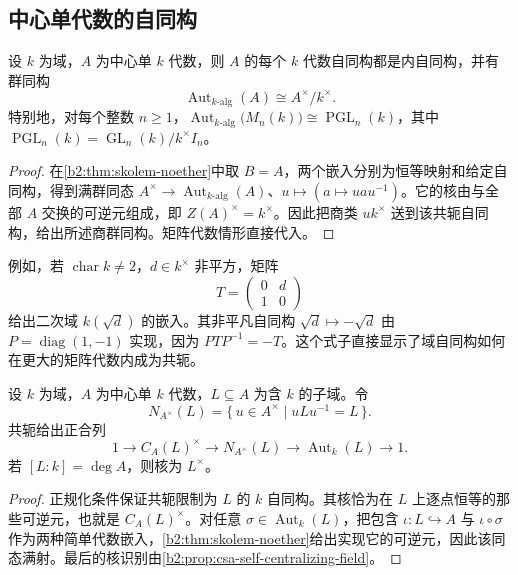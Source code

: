 \subsection{中心单代数的自同构}
\label{b2:subsec:1703:02}

\begin{corollary}\label{b2:cor:csa-automorphisms-inner}
	设 \(k\) 为域，\(A\) 为中心单 \(k\) 代数，则 \(A\) 的每个 \(k\) 代数自同构都是内自同构，并有群同构
	\[
		\operatorname{Aut}_{k\text{-alg}}(A)\cong A^\times/k^\times.
	\]
	特别地，对每个整数 \(n\ge1\)，\(\operatorname{Aut}_{k\text{-alg}}\bigl(M_n(k)\bigr)\cong\operatorname{PGL}_n(k)\)，其中 \(\operatorname{PGL}_n(k)=\operatorname{GL}_n(k)/k^\times I_n\)。
\end{corollary}
\begin{proof}
	在\cref{b2:thm:skolem-noether}中取 \(B=A\)，两个嵌入分别为恒等映射和给定自同构，得到满群同态 \(A^\times\to\operatorname{Aut}_{k\text{-alg}}(A)\)、\(u\mapsto(a\mapsto uau^{-1})\)。它的核由与全部 \(A\) 交换的可逆元组成，即 \(Z(A)^\times=k^\times\)。因此把商类 \(uk^\times\) 送到该共轭自同构，给出所述商群同构。矩阵代数情形直接代入。
\end{proof}

例如，若 \(\operatorname{char}k\ne2\)，\(d\in k^\times\) 非平方，矩阵
\[
	T=\begin{pmatrix}0&d\\1&0\end{pmatrix}
\]
给出二次域 \(k(\sqrt d)\) 的嵌入。其非平凡自同构 \(\sqrt d\mapsto-\sqrt d\) 由 \(P=\operatorname{diag}(1,-1)\) 实现，因为 \(PTP^{-1}=-T\)。这个式子直接显示了域自同构如何在更大的矩阵代数内成为共轭。

\begin{corollary}\label{b2:cor:csa-field-normalizer}
	设 \(k\) 为域，\(A\) 为中心单 \(k\) 代数，\(L\subseteq A\) 为含 \(k\) 的子域。令
	\[
		N_{A^\times}(L)=\{\,u\in A^\times\mid uLu^{-1}=L\,\}.
	\]
	共轭给出正合列
	\[
		1\longrightarrow C_A(L)^\times\longrightarrow N_{A^\times}(L) \longrightarrow\operatorname{Aut}_k(L)\longrightarrow1.
	\]
	若 \([L:k]=\deg A\)，则核为 \(L^\times\)。
\end{corollary}
\begin{proof}
	正规化条件保证共轭限制为 \(L\) 的 \(k\) 自同构。其核恰为在 \(L\) 上逐点恒等的那些可逆元，也就是 \(C_A(L)^\times\)。对任意 \(\sigma\in\operatorname{Aut}_k(L)\)，把包含 \(\iota:L\hookrightarrow A\) 与 \(\iota\circ\sigma\) 作为两种简单代数嵌入，\cref{b2:thm:skolem-noether}给出实现它的可逆元，因此该同态满射。最后的核识别由\cref{b2:prop:csa-self-centralizing-field}。
\end{proof}

